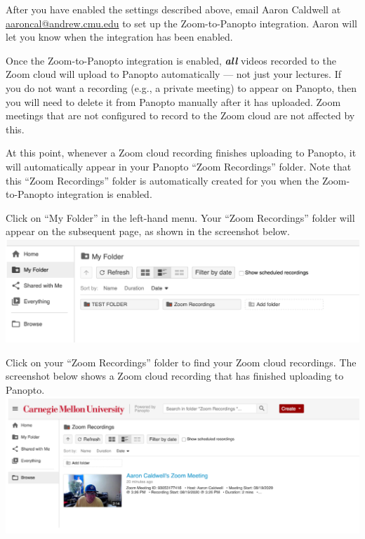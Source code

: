 \begin{gram}[Step 2/2]
	After you have enabled the settings described above, email Aaron Caldwell at \href{mailto:aaroncal@andrew.cmu.edu?subject=Zoom-to-Panopto}{aaroncal@andrew.cmu.edu} to set up the Zoom-to-Panopto integration. Aaron will let you know when the integration has been enabled.
\end{gram}

\begin{important}
	Once the Zoom-to-Panopto integration is enabled, \emph{\textbf{all}} videos recorded to the Zoom cloud will upload to Panopto automatically --- not just your lectures. If you do not want a recording (e.g., a private meeting) to appear on Panopto, then you will need to delete it from Panopto manually after it has uploaded. Zoom meetings that are not configured to record to the Zoom cloud are not affected by this.
\end{important}

\begin{gram}
 	At this point, whenever a Zoom cloud recording finishes uploading to Panopto, it will automatically appear in your Panopto ``Zoom Recordings'' folder. Note that this ``Zoom Recordings'' folder is automatically created for you when the Zoom-to-Panopto integration is enabled.
\end{gram}

\begin{gram}
	Click on ``My Folder'' in the left-hand menu. Your ``Zoom Recordings'' folder will appear on the subsequent page, as shown in the screenshot below.
{
		\centering
		\includegraphics[scale=0.4]{panopto/media/05-my-folder.png}
}
\end{gram}

\begin{gram}
	Click on your ``Zoom Recordings'' folder to find your Zoom cloud recordings. The screenshot below shows a Zoom cloud recording that has finished uploading to Panopto.
{
		\centering
		\includegraphics[scale=0.4]{panopto/media/06-zoom-recordings.png}
}
\end{gram}

